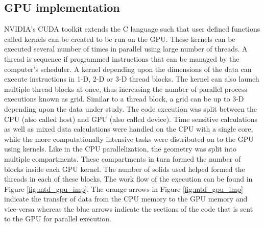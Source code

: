 \documentclass[preprint,10pt,authoryear,review]{elsarticle}
\begin{document}
\subsection{GPU implementation}
NVIDIA’s CUDA toolkit extends the C language such that user defined functions 
called kernels can be created to be run on the GPU. These kernels can be 
executed several number of times in parallel using large number of threads. A thread is 
sequence if programmed instructions that can be managed by the computer’s 
scheduler. A kernel depending upon the dimensions of the data can execute 
instructions in 1-D, 2-D or 3-D thread blocks. The kernel can also launch 
multiple thread blocks at once, thus increasing the number of parallel 
process executions known as grid. Similar to a thread block, a grid can 
be up to 3-D depending upon the data under study.
The code execution was split between the CPU (also called host) and GPU 
(also called device). Time sensitive calculations as well as mixed data 
calculations were handled on the CPU with a single core, while the more 
computationally intensive tasks were distributed on to the GPU using 
kernels. Like in the CPU parallelization, the geometry was split into 
multiple compartments. These compartments in turn formed the number of 
blocks inside each GPU kernel. The number of solids used helped formed 
the threads in each of these blocks. The work flow of the execution can 
be found in Figure \ref{fig:mtd_gpu_imp}. The orange arrows in Figure 
\ref{fig:mtd_gpu_imp} indicate the 
transfer of data from the CPU memory to the GPU memory and vice-versa 
whereas the blue arrows indicate the sections of the code that is sent 
to the GPU for parallel execution.
\end{document}
